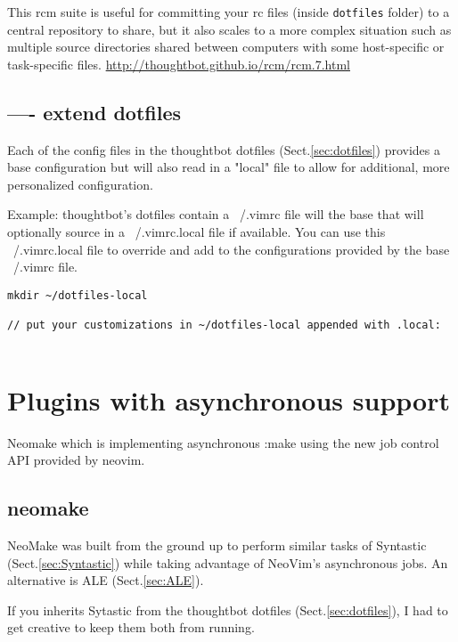 This rcm suite is useful for committing your rc files (inside \verb!dotfiles!
folder) to a central repository to share, but it also scales to a more complex
situation such as multiple source directories shared between computers with some
host-specific or task-specific files.
\url{http://thoughtbot.github.io/rcm/rcm.7.html}


\subsection{---- extend dotfiles}
\label{sec:dotfiles-customized}

Each of the config files in the thoughtbot dotfiles (Sect.\ref{sec:dotfiles})
provides a base configuration but will also read in a "local" file to allow for
additional, more personalized configuration.

Example:  thoughtbot's dotfiles contain a ~/.vimrc file will the base that will
optionally source in a ~/.vimrc.local file if available. You can use this
~/.vimrc.local file to override and add to the configurations provided by the
base ~/.vimrc file.


\begin{verbatim}
mkdir ~/dotfiles-local

// put your customizations in ~/dotfiles-local appended with .local:


\end{verbatim}



\section{Plugins with asynchronous support}


Neomake which is implementing asynchronous :make using the new job control API
provided by neovim.

\subsection{neomake}
\label{sec:neomake}

NeoMake was built from the ground up to perform similar tasks of Syntastic
(Sect.\ref{sec:Syntastic}) while taking advantage of NeoVim's asynchronous jobs.
An alternative is ALE (Sect.\ref{sec:ALE}).

If you inherits Sytastic from the thoughtbot dotfiles (Sect.\ref{sec:dotfiles}),
I had to get creative to keep them both from running. 




